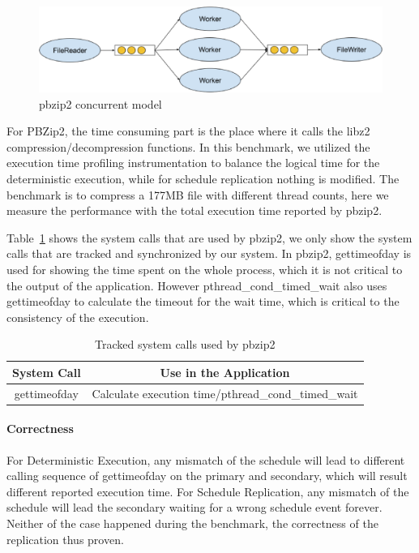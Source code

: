 \begin{figure}
\centering
\includegraphics[width=0.8\columnwidth]{figures/pbzip2_model}
\caption{pbzip2 concurrent model}
\label{f:pbzip_model}
\end{figure}

For PBZip2, the time consuming part is the place where it calls the libz2 compression/decompression functions. In this benchmark, we utilized the execution time profiling instrumentation to balance the logical time for the deterministic execution, while for schedule replication nothing is modified. The benchmark is to compress a 177MB file with different thread counts, here we measure the performance with the total execution time reported by pbzip2.

Table~\ref{t:pbzip2_syscall} shows the system calls that are used by pbzip2, we only show the system calls that are tracked and synchronized by our system. In pbzip2,  gettimeofday is used for showing the time spent on the whole process, which it is not critical to the output of the application. However pthread\_cond\_timed\_wait also uses gettimeofday to calculate the timeout for the wait time, which is critical to the consistency of the execution.

\begin{table}
 \caption{Tracked system calls used by pbzip2}
\begin{center}
 \begin{tabular}{c | c}
 System Call & Use in the Application\\ \hline
 gettimeofday & Calculate execution time/pthread\_cond\_timed\_wait
 \end{tabular}
\end{center}
\label{t:pbzip2_syscall}
\end{table}

\paragraph{Correctness} For Deterministic Execution, any mismatch of the schedule will lead to different calling sequence of gettimeofday on the primary and secondary, which will result different reported execution time. For Schedule Replication, any mismatch of the schedule will lead the secondary waiting for a wrong schedule event forever. Neither of the case happened during the benchmark, the correctness of the replication thus proven.

